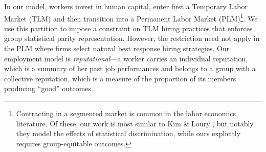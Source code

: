 \documentclass[sigconf]{acmart}
\theoremstyle{definition}
\begin{document}

In our model, workers invest in human capital, enter first a Temporary Labor Market (TLM) and then transition into a Permanent Labor Market (PLM)\footnote{Contracting in a segmented market is common in the labor economics literature. Of these, our work is most similar to Kim \& Loury \cite{loury2014collective}, but notably they model the effects of statistical discrimination, while ours explicitly requires group-equitable outcomes.}. We use this partition to impose a constraint on TLM hiring practices that enforces group statistical parity representation. However, the restriction need not apply in the PLM where firms select natural best response hiring strategies. Our employment model is \textit{reputational}---a worker carries an individual reputation, which is a summary of her past job performances and belongs to a group with a collective reputation, which is a measure of the proportion of its members producing ``good'' outcomes. 
\end{document}
